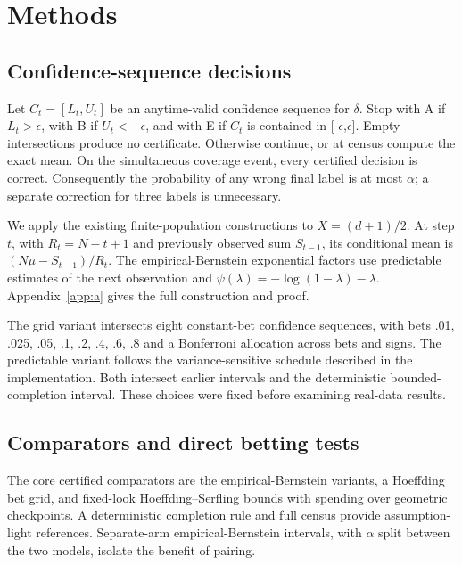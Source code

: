 \section{Methods}\label{sec:4}\label{methods}

\subsection{Confidence-sequence decisions}\label{confidence-sequence-decisions}

Let \(C_t=[L_t,U_t]\) be an anytime-valid confidence sequence for \(\delta\). Stop with A if \(L_t>\epsilon\), with B if \(U_t<-\epsilon\), and with E if \(C_t\) is contained in {[}-\(\epsilon\),\(\epsilon\){]}. Empty intersections produce no certificate. Otherwise continue, or at census compute the exact mean. On the simultaneous coverage event, every certified decision is correct. Consequently the probability of any wrong final label is at most \(\alpha\); a separate correction for three labels is unnecessary.

We apply the existing finite-population constructions to \(X=(d+1)/2\). At step \(t\), with \(R_t=N-t+1\) and previously observed sum \(S_{t-1}\), its conditional mean is \((N\mu-S_{t-1})/R_t\). The empirical-Bernstein exponential factors use predictable estimates of the next observation and \(\psi(\lambda)=-\log(1-\lambda)-\lambda\). Appendix~\ref{app:a} gives the full construction and proof.

The grid variant intersects eight constant-bet confidence sequences, with bets .01, .025, .05, .1, .2, .4, .6, .8 and a Bonferroni allocation across bets and signs. The predictable variant follows the variance-sensitive schedule described in the implementation. Both intersect earlier intervals and the deterministic bounded-completion interval. These choices were fixed before examining real-data results.

\subsection{Comparators and direct betting tests}\label{comparators-and-direct-betting-tests}

The core certified comparators are the empirical-Bernstein variants, a Hoeffding bet grid, and fixed-look Hoeffding--Serfling bounds with spending over geometric checkpoints. A deterministic completion rule and full census provide assumption-light references. Separate-arm empirical-Bernstein intervals, with \(\alpha\) split between the two models, isolate the benefit of pairing.

